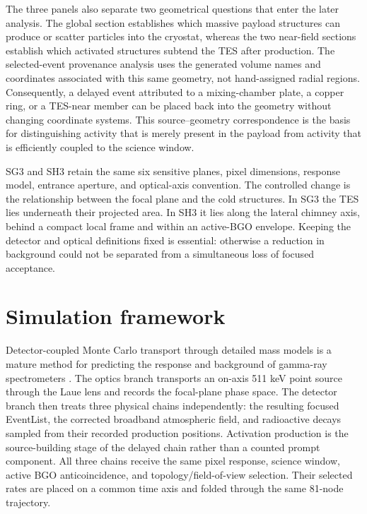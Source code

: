 \documentclass[11pt]{article}
\begin{document}
The three panels also separate two geometrical questions that enter the later
analysis. The global section establishes which massive payload structures can
produce or scatter particles into the cryostat, whereas the two near-field
sections establish which activated structures subtend the TES after production.
The selected-event provenance analysis uses the generated volume names and
coordinates associated with this same geometry, not hand-assigned radial
regions. Consequently, a delayed event attributed to a mixing-chamber plate,
a copper ring, or a TES-near member can be placed back into the geometry without
changing coordinate systems. This source--geometry correspondence is the
basis for distinguishing activity that is merely present in the payload from
activity that is efficiently coupled to the science window.

SG3 and SH3 retain the same six sensitive planes, pixel dimensions, response
model, entrance aperture, and optical-axis convention. The controlled change
is the relationship between the focal plane and the cold structures. In SG3
the TES lies underneath their projected area. In SH3 it lies along the lateral
chimney axis, behind a compact local frame and within an active-BGO envelope.
Keeping the detector and optical definitions fixed is essential: otherwise a
reduction in background could not be separated from a simultaneous loss of
focused acceptance.

\FloatBarrier

\section{Simulation framework}
\label{sec:framework}

Detector-coupled Monte Carlo transport through detailed mass models is a
mature method for predicting the response and background of gamma-ray
spectrometers \cite{Sturner2003}. The optics branch transports an on-axis 511 keV
point source through the Laue lens and records the focal-plane phase space. The
detector branch then treats three physical chains independently: the resulting
focused EventList, the corrected broadband atmospheric field, and radioactive
decays sampled from their recorded production positions. Activation production
is the source-building stage of the delayed chain rather than a counted prompt
component. All three chains receive the same pixel response, science window,
active BGO anticoincidence, and topology/field-of-view selection. Their selected
rates are placed on a common time axis and folded through the same 81-node
trajectory.
\end{document}
